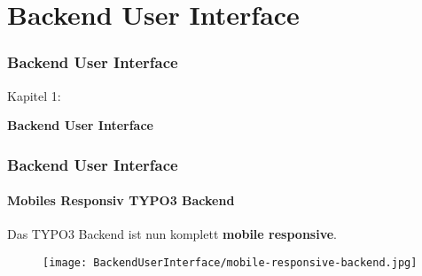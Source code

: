 %

\section{Backend User Interface}
\begin{frame}[fragile]
	\frametitle{Backend User Interface}

	\begin{center}\huge{Kapitel 1:}\end{center}
	\begin{center}\huge{\color{typo3darkgrey}\textbf{Backend User Interface}}\end{center}

\end{frame}


\begin{frame}[fragile]
	\frametitle{Backend User Interface}
	\framesubtitle{Mobiles Responsiv TYPO3 Backend}

	Das TYPO3 Backend ist nun komplett \textbf{mobile responsive}.

	\begin{figure}
		\texttt{[image: BackendUserInterface/mobile-responsive-backend.jpg]}
	\end{figure}

\end{frame}



